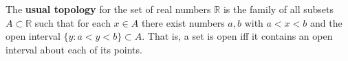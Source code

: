 The \textbf{usual topology} for the set of real numbers $\mathbb{R}$ is the family of all subsets $A \subset \mathbb{R}$ such that for each $x \in A$ there exist numbers $a, b$ with $a < x < b$ and the open interval $\{y : a < y < b\} \subset A$. That is, a set is open iff it contains an open interval about each of its points.
